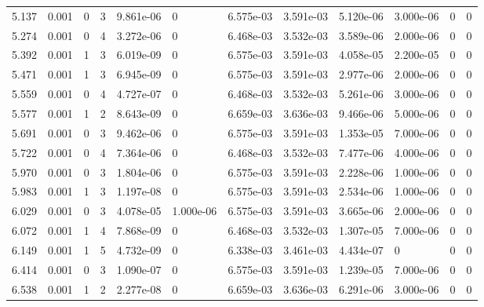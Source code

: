 \documentclass[preview]{standalone}
\begin{document}
{{\begin{tabular}{L{1.2cm}C{1.2cm} C{0.3cm}C{0.5cm} C{1.4cm}C{1.4cm} C{1.4cm}C{1.4cm} C{1.6cm}C{1.6cm} C{1.6cm}C{1.6cm}}
  5.137  &  0.001  & 0     &  3 &  9.861e-06  & 0  &  6.575e-03&   3.591e-03& 5.120e-06 & 3.000e-06   &  0 & 0  \\ 
  5.274  &  0.001  & 0     &  4 &  3.272e-06  & 0  &  6.468e-03&   3.532e-03& 3.589e-06 & 2.000e-06   &  0 & 0  \\ 
  5.392  &  0.001  & 1     &  3 &  6.019e-09  & 0  &  6.575e-03&   3.591e-03& 4.058e-05 & 2.200e-05   &  0 & 0  \\ 
  5.471  &  0.001  & 1     &  3 &  6.945e-09  & 0  &  6.575e-03&   3.591e-03& 2.977e-06 & 2.000e-06   &  0 & 0  \\ 
  5.559  &  0.001  & 0     &  4 &  4.727e-07  & 0  &  6.468e-03&   3.532e-03& 5.261e-06 & 3.000e-06   &  0 & 0  \\ 
  5.577  &  0.001  & 1     &  2 &  8.643e-09  & 0  &  6.659e-03&   3.636e-03& 9.466e-06 & 5.000e-06   &  0 & 0  \\ 
  5.691  &  0.001  & 0     &  3 &  9.462e-06  & 0  &  6.575e-03&   3.591e-03& 1.353e-05 & 7.000e-06   &  0 & 0  \\ 
  5.722  &  0.001  & 0     &  4 &  7.364e-06  & 0  &  6.468e-03&   3.532e-03& 7.477e-06 & 4.000e-06   &  0 & 0  \\ 
  5.970  &  0.001  & 0     &  3 &  1.804e-06  & 0  &  6.575e-03&   3.591e-03& 2.228e-06 & 1.000e-06   &  0 & 0  \\ 
  5.983  &  0.001  & 1     &  3 &  1.197e-08  & 0  &  6.575e-03&   3.591e-03& 2.534e-06 & 1.000e-06   &  0 & 0  \\ 
  6.029  &  0.001  & 0     &  3 &  4.078e-05  & 1.000e-06  &  6.575e-03&   3.591e-03& 3.665e-06 & 2.000e-06   &  0 & 0  \\ 
  6.072  &  0.001  & 1     &  4 &  7.868e-09  & 0  &  6.468e-03&   3.532e-03& 1.307e-05 & 7.000e-06   &  0 & 0  \\ 
  6.149  &  0.001  & 1     &  5 &  4.732e-09  & 0  &  6.338e-03&   3.461e-03& 4.434e-07 & 0   &  0 & 0  \\ 
  6.414  &  0.001  & 0     &  3 &  1.090e-07  & 0  &  6.575e-03&   3.591e-03& 1.239e-05 & 7.000e-06   &  0 & 0  \\ 
  6.538  &  0.001  & 1     &  2 &  2.277e-08  & 0  &  6.659e-03&   3.636e-03& 6.291e-06 & 3.000e-06   &  0 & 0  \\ 
\hline 
\end{tabular} 

}}
\end{document}
